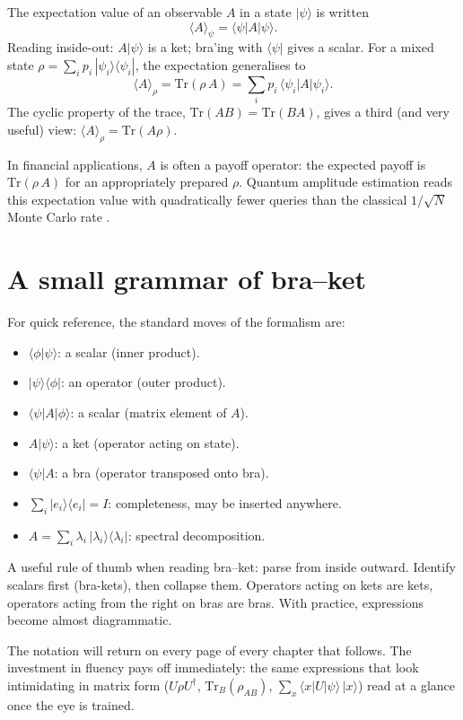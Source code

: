 The expectation value of an observable $A$ in a state $|\psi\rangle$ is written
\[
  \langle A\rangle_\psi = \langle\psi|A|\psi\rangle.
\]
Reading inside-out: $A|\psi\rangle$ is a ket; bra'ing with $\langle\psi|$ gives a scalar. For a mixed state $\rho = \sum_i p_i\,|\psi_i\rangle\langle\psi_i|$, the expectation generalises to
\[
  \langle A\rangle_\rho = \mathrm{Tr}(\rho\,A) = \sum_i p_i\,\langle\psi_i|A|\psi_i\rangle.
\]
The cyclic property of the trace, $\mathrm{Tr}(AB) = \mathrm{Tr}(BA)$, gives a third (and very useful) view: $\langle A\rangle_\rho = \mathrm{Tr}(A\rho)$.

In financial applications, $A$ is often a payoff operator: the expected payoff is $\mathrm{Tr}(\rho\,A)$ for an appropriately prepared $\rho$. Quantum amplitude estimation reads this expectation value with quadratically fewer queries than the classical $1/\sqrt{N}$ Monte Carlo rate \citep{egger_quantum_2020}.

\section{A small grammar of bra--ket}

For quick reference, the standard moves of the formalism are:

\begin{itemize}
  \item $\langle\phi|\psi\rangle$: a scalar (inner product).
  \item $|\psi\rangle\langle\phi|$: an operator (outer product).
  \item $\langle\psi|A|\phi\rangle$: a scalar (matrix element of $A$).
  \item $A|\psi\rangle$: a ket (operator acting on state).
  \item $\langle\psi|A$: a bra (operator transposed onto bra).
  \item $\sum_i |e_i\rangle\langle e_i| = I$: completeness, may be inserted anywhere.
  \item $A = \sum_i \lambda_i\,|\lambda_i\rangle\langle\lambda_i|$: spectral decomposition.
\end{itemize}

\begin{remark}
A useful rule of thumb when reading bra--ket: parse from inside outward. Identify scalars first (bra-kets), then collapse them. Operators acting on kets are kets, operators acting from the right on bras are bras. With practice, expressions become almost diagrammatic.
\end{remark}

The notation will return on every page of every chapter that follows. The investment in fluency pays off immediately: the same expressions that look intimidating in matrix form ($U\rho U^\dagger$, $\mathrm{Tr}_B(\rho_{AB})$, $\sum_x \langle x|U|\psi\rangle\,|x\rangle$) read at a glance once the eye is trained.

\textsep
